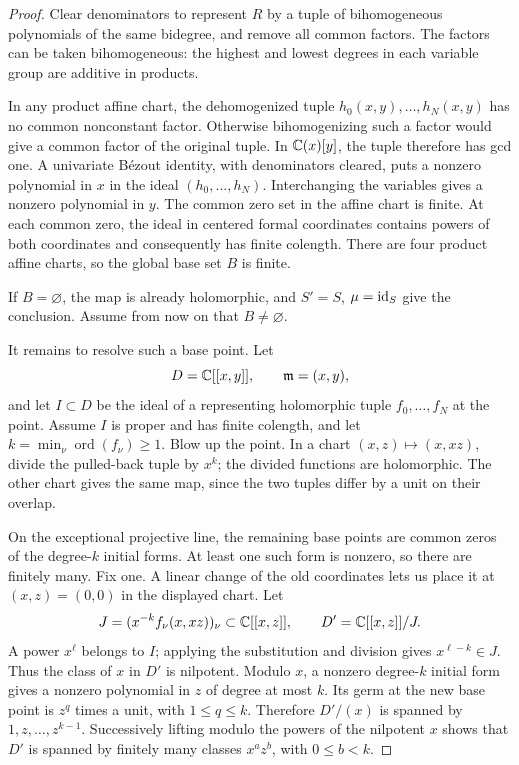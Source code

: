 \begin{proof}
Clear denominators to represent \(R\) by a tuple of
bihomogeneous polynomials of the same bidegree, and remove
all common factors. The factors can be taken bihomogeneous:
the highest and lowest degrees in each variable group are
additive in products.

In any product affine chart, the dehomogenized tuple
\(h_0(x,y),\ldots,h_N(x,y)\) has no common nonconstant factor.
Otherwise bihomogenizing such a factor would give a common
factor of the original tuple. In \(\mathbb C(x)[y]\), the tuple
therefore has gcd one. A univariate B\'ezout identity, with
denominators cleared, puts a nonzero polynomial in \(x\)
in the ideal \((h_0,\ldots,h_N)\). Interchanging the variables
gives a nonzero polynomial in \(y\). The common zero set
in the affine chart is finite. At each common zero, the ideal
in centered formal coordinates contains powers of both
coordinates and consequently has finite colength.
There are four product affine charts, so the global base set
\(B\) is finite.

If \(B=\varnothing\), the map is already holomorphic, and
\(S'=S\), \(\mu=\operatorname{id}_S\) give the conclusion. Assume from now on
that \(B\ne\varnothing\).

It remains to resolve such a base point. Let
\[
D=\mathbb C[[x,y]],\qquad \mathfrak m=(x,y),
\]
and let \(I\subset D\) be the ideal of a representing holomorphic
tuple \(f_0,\ldots,f_N\) at the point. Assume \(I\) is proper
and has finite colength, and let
\(k=\min_\nu\operatorname{ord}(f_\nu)\ge1\).
Blow up the point. In a chart \((x,z)\mapsto(x,xz)\), divide
the pulled-back tuple by \(x^k\); the divided functions are
holomorphic. The other chart gives the same map, since the
two tuples differ by a unit on their overlap.

On the exceptional projective line, the remaining base points
are common zeros of the degree-\(k\) initial forms.
At least one such form is nonzero, so there are finitely many.
Fix one. A linear change of the old coordinates lets us place
it at \((x,z)=(0,0)\) in the displayed chart. Let
\[
J=(x^{-k}f_\nu(x,xz))_\nu\subset\mathbb C[[x,z]],
\qquad D'=\mathbb C[[x,z]]/J.
\]
A power \(x^\ell\) belongs to \(I\); applying the substitution
and division gives \(x^{\ell-k}\in J\).
Thus the class of \(x\) in \(D'\) is nilpotent.
Modulo \(x\), a nonzero degree-\(k\) initial form gives a
nonzero polynomial in \(z\) of degree at most \(k\). Its
germ at the new base point is \(z^q\) times a unit, with
\(1\le q\le k\). Therefore \(D'/(x)\) is spanned by
\(1,z,\ldots,z^{k-1}\).
Successively lifting modulo the powers of the nilpotent \(x\)
shows that \(D'\) is spanned by finitely many classes
\(x^az^b\), with \(0\le b<k\).


\end{proof}
